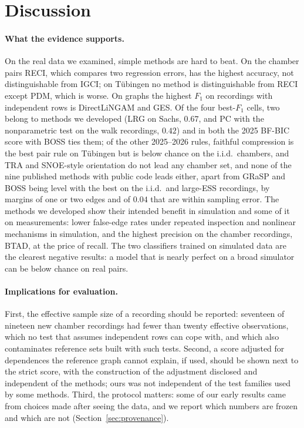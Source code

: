 
\section{Discussion}\label{sec:discussion}

\paragraph{What the evidence supports.} On the real data we examined, simple methods are hard
to beat. On the chamber pairs RECI, which compares two regression errors, has the highest accuracy,
not distinguishable from IGCI; on Tübingen no method is distinguishable from RECI except PDM, which is
worse. On graphs the highest $F_1$ on recordings with independent rows is DirectLiNGAM and GES. Of
the four best-$F_1$ cells, two belong to methods we developed (LRG on Sachs, $0.67$, and PC with the
nonparametric test on the walk recordings, $0.42$) and in both the 2025 BF-BIC score with BOSS ties them; of the other 2025--2026 rules, faithful compression is the best pair rule on T\"ubingen but is below chance on the i.i.d.\ chambers, and TRA and SNOE-style orientation do not lead any chamber set, and none of the nine published methods with public code leads either, apart from GRaSP and BOSS being level with the best on the i.i.d.\ and large-ESS recordings, by margins of one or two edges and of $0.04$ that are
within sampling error. The methods we developed show their intended benefit in simulation and some
of it on measurements: lower false-edge rates under repeated inspection and nonlinear mechanisms in
simulation, and the highest precision on the chamber recordings, BTAD, at the price of recall. The
two classifiers trained on simulated data are the clearest negative results: a model that is nearly
perfect on a broad simulator can be below chance on real pairs.

\paragraph{Implications for evaluation.} First, the effective sample size of a recording
should be reported: seventeen of nineteen new chamber recordings had fewer than twenty
effective observations, which no test that assumes independent rows can cope with, and which
also contaminates reference sets built with such tests. Second, a score adjusted for
dependences the reference graph cannot explain, if used, should be shown next to the strict score,
with the construction of the adjustment disclosed and independent of the methods; ours was not
independent of the test families used by some methods. Third, the protocol matters: some of our early
results came from choices made after seeing the data, and we report which numbers are frozen and which
are not (Section~\ref{sec:provenance}).

